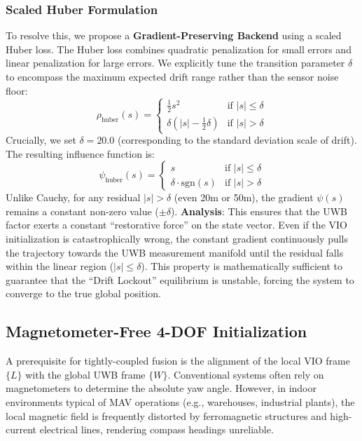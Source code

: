 \documentclass[conference]{IEEEtran}
\begin{document}
\subsubsection{Scaled Huber Formulation}
To resolve this, we propose a \textbf{Gradient-Preserving Backend} using a scaled Huber loss. The Huber loss combines quadratic penalization for small errors and linear penalization for large errors. We explicitly tune the transition parameter $\delta$ to encompass the maximum expected drift range rather than the sensor noise floor:
\begin{equation}
\rho_{\text{huber}}(s) = \begin{cases} 
\frac{1}{2}s^2 & \text{if } |s| \le \delta \\
\delta(|s| - \frac{1}{2}\delta) & \text{if } |s| > \delta
\end{cases}
\end{equation}
Crucially, we set \textbf{$\delta = 20.0$} (corresponding to the standard deviation scale of drift). The resulting influence function is:
\begin{equation}
\psi_{\text{huber}}(s) = \begin{cases} 
s & \text{if } |s| \le \delta \\
\delta \cdot \text{sgn}(s) & \text{if } |s| > \delta
\end{cases}
\end{equation}
Unlike Cauchy, for any residual $|s| > \delta$ (even 20m or 50m), the gradient $\psi(s)$ remains a constant non-zero value ($\pm \delta$).
\textbf{Analysis}: This ensures that the UWB factor exerts a constant ``restorative force'' on the state vector. Even if the VIO initialization is catastrophically wrong, the constant gradient continuously pulls the trajectory towards the UWB measurement manifold until the residual falls within the linear region ($|s| \le \delta$). This property is mathematically sufficient to guarantee that the ``Drift Lockout'' equilibrium is unstable, forcing the system to converge to the true global position.

\subsection{Magnetometer-Free 4-DOF Initialization}
A prerequisite for tightly-coupled fusion is the alignment of the local VIO frame $\{L\}$ with the global UWB frame $\{W\}$. Conventional systems often rely on magnetometers to determine the absolute yaw angle. However, in indoor environments typical of MAV operations (e.g., warehouses, industrial plants), the local magnetic field is frequently distorted by ferromagnetic structures and high-current electrical lines, rendering compass headings unreliable.
\end{document}
